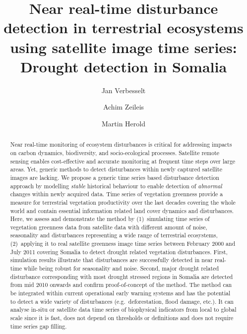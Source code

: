 \documentclass[authoryear,preprint,review,10pt]{elsarticle}
\begin{document}
\linenumbers

\begin{frontmatter}

    \title
    {
Near real-time disturbance detection in terrestrial ecosystems using satellite image time series: \\ Drought detection in Somalia
    }
    \author[WUR]{Jan Verbesselt}
    \author[UIBK]{Achim Zeileis}
    \author[WUR]{Martin Herold}
    \address[WUR]{Remote Sensing Team, Wageningen University, \\
           Droevendaalsesteeg 3, Wageningen 6708 PB, The Netherlands \\
           \emph{Ph}: + 31 317 48 52 68; \emph{Fax}: +31 317 419000}
    \address[UIBK]{Department of Statistics, Universit\"at Innsbruck \\
           Universit\"atsstr.~15, A-6020 Innsbruck, Austria}

\begin{abstract}
Near real-time monitoring of ecosystem disturbances is critical for addressing impacts on carbon dynamics, biodiversity, and socio-ecological processes. Satellite remote sensing enables cost-effective and accurate monitoring at frequent time steps over large areas. Yet, generic methods to detect disturbances within newly captured satellite images are lacking. 
We propose a generic time series based disturbance detection approach by modelling \emph{stable} historical behaviour to enable detection of \emph{abnormal} changes within newly acquired data.
Time series of vegetation greenness provide a measure for terrestrial vegetation productivity over the last decades covering the whole world and contain essential information related land cover dynamics and disturbances. Here, we assess and demonstrate the method by (1)~simulating time series of vegetation greenness data from satellite data with different amount of noise, seasonality and disturbances representing a wide range of terrestrial ecosystems, (2)~applying it to real satellite greenness image time series between February 2000 and July 2011 covering Somalia to  detect drought related vegetation disturbances.
First, simulation results illustrate that disturbances are successfully detected in near real-time while being robust for seasonality and noise. Second, major drought related disturbance corresponding with most drought stressed regions in Somalia are detected from mid 2010 onwards and confirm proof-of-concept of the method. The method can be integrated within current operational early warning systems and has the potential to detect a wide variety of disturbances (e.g.\ deforestation, flood damage, etc.). It can analyse in-situ or satellite data time series of biophysical indicators from local to global scale since it is fast, does not depend on thresholds or definitions and does not require time series gap filling. 
\end{abstract}


\end{frontmatter}
\end{document}
